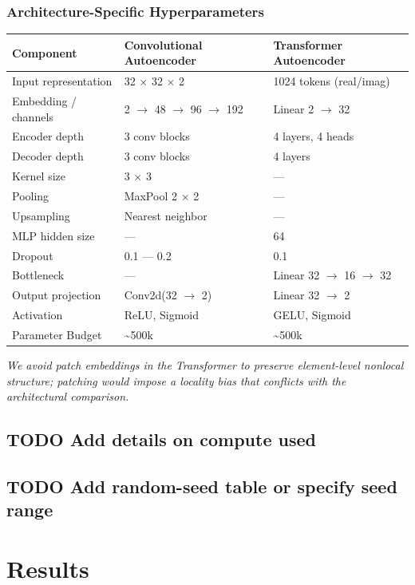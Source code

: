 \documentclass[11pt]{article}
\begin{document}
\subsubsection{Architecture-Specific Hyperparameters}
\label{sec:org838c10d}
\begin{center}
\begin{tabular}{lll}
Component & Convolutional Autoencoder & Transformer Autoencoder\\
\hline
Input representation & 32 \(\times\) 32 \(\times\) 2 & 1024 tokens (real/imag)\\
Embedding / channels & 2 \(\rightarrow\) 48 \(\rightarrow\) 96 \(\rightarrow\) 192 & Linear 2 \(\rightarrow\) 32\\
Encoder depth & 3 conv blocks & 4 layers, 4 heads\\
Decoder depth & 3 conv blocks & 4 layers\\
Kernel size & 3 \(\times\) 3 & —\\
Pooling & MaxPool 2 \(\times\) 2 & —\\
Upsampling & Nearest neighbor & —\\
MLP hidden size & — & 64\\
Dropout & 0.1 — 0.2 & 0.1\\
Bottleneck & — & Linear 32 \(\rightarrow\) 16 \(\rightarrow\) 32\\
Output projection & Conv2d(32 \(\rightarrow\) 2) & Linear 32 \(\rightarrow\) 2\\
Activation & ReLU, Sigmoid & GELU, Sigmoid\\
Parameter Budget & \textasciitilde{}500k & \textasciitilde{}500k\\
\end{tabular}
\end{center}
\emph{We avoid patch embeddings in the Transformer to preserve element-level nonlocal structure; patching would impose a locality bias that conflicts with the architectural comparison.}
\subsection{{\bfseries\sffamily TODO} Add details on compute used}
\label{sec:org3c2e328}
\subsection{{\bfseries\sffamily TODO} Add random-seed table or specify seed range}
\label{sec:orgdcc7c4d}
\section{Results}
\label{sec:orge98c19b}
\end{document}
